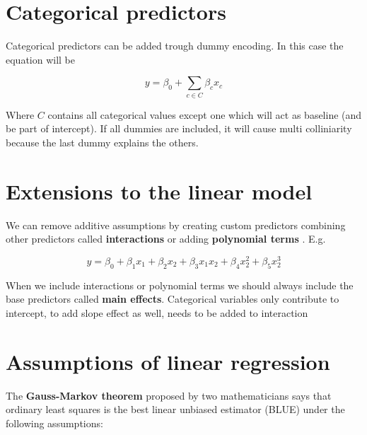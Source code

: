 \section{Categorical predictors}

Categorical predictors can be added trough dummy encoding. In this case the equation will be

\[y = \beta_0 + \sum_{c \in C}\beta_cx_c\]

Where \(C\) contains all categorical values except one which will act as baseline (and be part of intercept). If all dummies are included, it will cause multi colliniarity because the last dummy explains the others.

\section{Extensions to the linear model}

We can remove additive assumptions by creating custom predictors combining other predictors called \textbf{interactions} or adding \textbf{polynomial terms} . E.g.

\[y = \beta_0 + \beta_1x_1 + \beta_2x_2 + \beta_3x_1x_2 + \beta_4x_2^2 + \beta_5x_2^3\]

When we include interactions or polynomial terms we should always include the base predictors called \textbf{main effects}. Categorical variables only contribute to intercept, to add slope effect as well, needs to be added to interaction

\section{Assumptions of linear regression}

The \textbf{Gauss-Markov theorem} proposed by two mathematicians says that ordinary least squares is the best linear unbiased estimator (BLUE) under the following assumptions:

